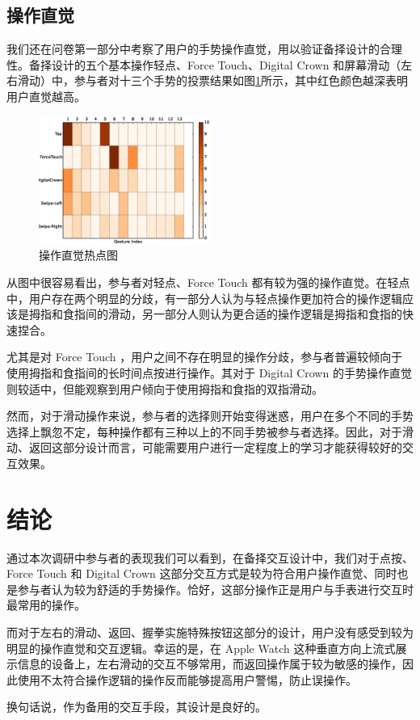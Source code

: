 \subsection{操作直觉}

我们还在问卷第一部分中考察了用户的手势操作直觉，用以验证备择设计的合理性。备择设计的五个基本操作轻点、Force Touch、Digital Crown 和屏幕滑动（左右滑动）中，参与者对十三个手势的投票结果如图\ref{fig:heat}所示，其中红色颜色越深表明用户直觉越高。

\begin{figure}[H]
    \kaishu
    \centering
    \includegraphics[width=0.5\textwidth]{figures/heat}
    \caption{\kaishu 操作直觉热点图}
    \label{fig:heat}
\end{figure}

从图中很容易看出，参与者对轻点、Force Touch 都有较为强的操作直觉。在轻点中，用户存在两个明显的分歧，有一部分人认为与轻点操作更加符合的操作逻辑应该是拇指和食指间的滑动，另一部分人则认为更合适的操作逻辑是拇指和食指的快速捏合。%

尤其是对 Force Touch ，用户之间不存在明显的操作分歧，参与者普遍较倾向于使用拇指和食指间的长时间点按进行操作。其对于 Digital Crown 的手势操作直觉则较适中，但能观察到用户倾向于使用拇指和食指的双指滑动。

然而，对于滑动操作来说，参与者的选择则开始变得迷惑，用户在多个不同的手势选择上飘忽不定，每种操作都有三种以上的不同手势被参与者选择。因此，对于滑动、返回这部分设计而言，可能需要用户进行一定程度上的学习才能获得较好的交互效果。

\section{结论}

通过本次调研中参与者的表现我们可以看到，在备择交互设计中，我们对于点按、Force Touch 和 Digital Crown 这部分交互方式是较为符合用户操作直觉、同时也是参与者认为较为舒适的手势操作。恰好，这部分操作正是用户与手表进行交互时最常用的操作。

而对于左右的滑动、返回、握拳实施特殊按钮这部分的设计，用户没有感受到较为明显的操作直觉和交互逻辑。幸运的是，在 Apple Watch 这种垂直方向上流式展示信息的设备上，左右滑动的交互不够常用，而返回操作属于较为敏感的操作，因此使用不太符合操作逻辑的操作反而能够提高用户警惕，防止误操作。

换句话说，作为备用的交互手段，其设计是良好的。

\cleardoublepage
